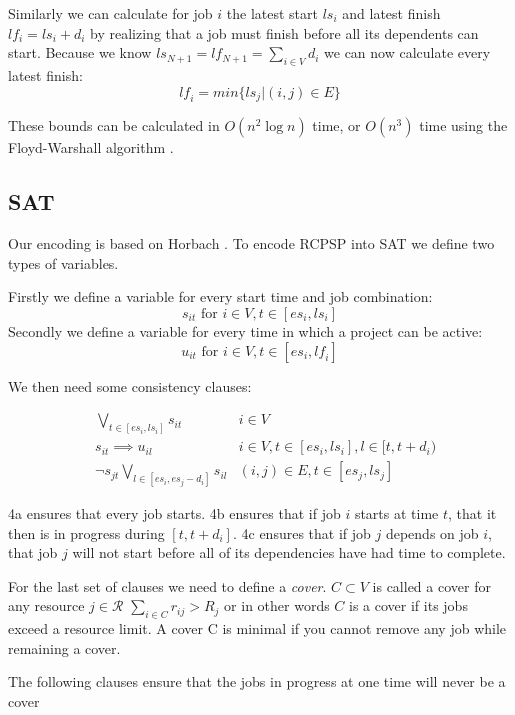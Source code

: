\documentclass{sig-alternate}
\newcommand{\mli}[1]{\mathit{#1}}
\begin{document}
Similarly we can calculate for job $i$ the latest start $ls_i$ and latest finish $lf_i = ls_i + d_i$ by realizing that a job must finish before all its dependents can start.
Because we know $ls_{N+1} = lf_{N+1} = \sum_{i \in V}{d_i}$ we can now calculate every latest finish:
$$\mli{lf}_i = min\{\mli{ls}_j | (i,j) \in E\}$$

These bounds can be calculated in $O(n^2 \log n)$ time, or $O(n^3)$ time using the Floyd-Warshall algorithm \cite{horbach2010boolean}.

\subsection{SAT}

Our encoding is based on Horbach \cite{horbach2010boolean}.
To encode RCPSP into SAT we define two types of variables.

Firstly we define a variable for every start time and job combination:
\[s_{it} \text{ for } i \in V, t \in [\mli{es_i},\mli{ls_i}]\]
Secondly we define a variable for every time in which a project can be active:
$$u_{it} \text{ for } i \in V, t \in [\mli{es_i},\mli{lf_i}]$$

We then need some consistency clauses:

\begin{subequations}
\begin{align}
        & \bigvee_{t \in [\mli{es_i},\mli{ls_i}]} s_{it}& i \in V\\
        & s_{it} \implies u_{il} & i \in V, t \in [\mli{es_i},\mli{ls_i}], l \in [t,t+d_i)  \\
        & \neg s_{jt} \bigvee_{l \in [\mli{es_i}, \mli{es_j}-d_i]} s_{il} & (i,j) \in E, t \in [\mli{es_j},\mli{ls_j}]
\end{align}
\end{subequations}

4a ensures that every job starts.
4b ensures that if job $i$ starts at time $t$, that it then is in progress during $[t,t+d_i]$.
4c ensures that if job $j$ depends on job $i$, that job $j$ will not start before all of its dependencies have had time to complete.

For the last set of clauses we need to define a \emph{cover}.
$C \subset V$ is called a cover for any resource $j \in \mathcal{R}$ $\sum_{i \in C}{r_{ij}} > R_j$ or in other words $C$ is a cover if its jobs exceed a resource limit. A cover C is minimal if you cannot remove any job while remaining a cover.

The following clauses ensure that the jobs in progress at one time will never be a cover
\end{document}

